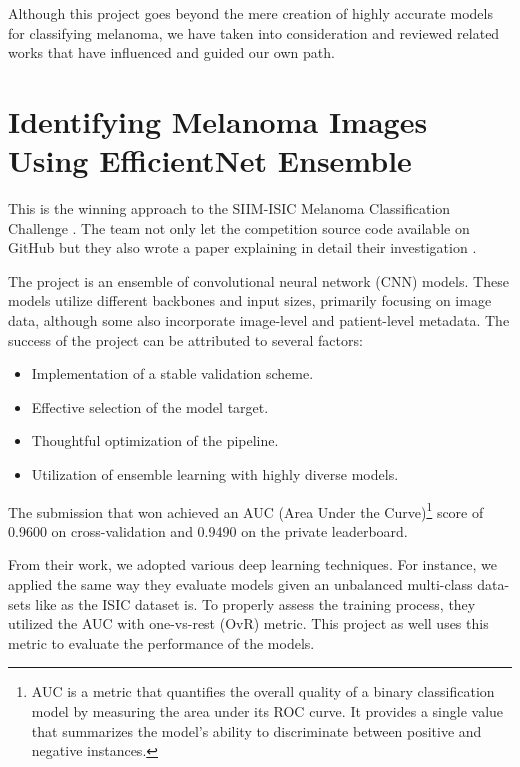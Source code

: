 Although this project goes beyond the mere creation of highly accurate models
for classifying melanoma, we have taken into consideration and reviewed related
works that have influenced and guided our own path.

\section{Identifying Melanoma Images Using EfficientNet Ensemble}

This is the winning approach to the SIIM-ISIC Melanoma Classification Challenge
\cite{ISICKaggle}. The team not only let the competition source code available
on GitHub \cite{WinningISICGithub} but they also wrote a paper explaining in
detail their investigation \cite{WinningISIC}. \newline

The project is an ensemble of convolutional neural network (CNN) models. These
models utilize different backbones and input sizes, primarily focusing on image
data, although some also incorporate image-level and patient-level metadata.
The success of the project can be attributed to several factors:

\begin{itemize}
  \item Implementation of a stable validation scheme.
  \item Effective selection of the model target.
  \item Thoughtful optimization of the pipeline.
  \item Utilization of ensemble learning with highly diverse models.
\end{itemize}

The submission that won achieved an AUC (Area Under the Curve)\footnote{AUC is
a metric that quantifies the overall quality of a binary classification model
by measuring the area under its ROC curve. It provides a single value that
summarizes the model's ability to discriminate between positive and negative
instances.} score of 0.9600 on cross-validation and 0.9490 on the private
leaderboard. \newline

From their work, we adopted various deep learning techniques. For instance, we
applied the same way they evaluate models given an unbalanced multi-class
data-sets like as the ISIC dataset is. To properly assess the training process,
they utilized the AUC with one-vs-rest (OvR) metric. This project as well uses
this metric to evaluate the performance of the models. \newline

